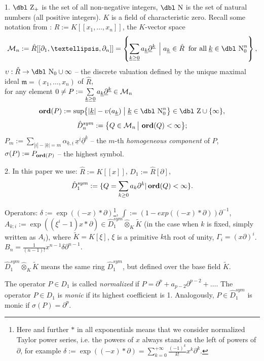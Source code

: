 \documentclass[11pt]{article}
\theoremstyle{definition}
\newcommand{\dz}{{\mbox{\dbl Z}}}
\newcommand{\dn}{{\mbox{\dbl N}}}
\newcommand{\idm}{\mathfrak{m}}
\newcommand{\Ord}{\mathop {\rm \bf ord}}
\theoremstyle{plain}
\numberwithin{equation}{section}
\newcommand{\cm}{{{\cal M}}}
\begin{document}
1. $\dz_+$ is the set of all non-negative integers, $\dn$ is the set of natural numbers (all positive integers). $K$ is a field of characteristic zero. Recall some notation from \cite{A.Z}:
	$\hat{R}:=K [[x_1,\ldots ,x_n]]$, the $K$-vector space 
$$
\cm_n := \hat{R} [[\partial_1, \dots, \partial_n]] = \left\{
\sum\limits_{\underline{k} \ge \underline{0}} a_{\underline{k}} \underline{\partial}^{\underline{k}} \; \left|\;  a_{\underline{k}} \in \hat{R} \right. \;\mbox{for all}\;  \underline{k} \in \dn_0^n
\right\},
$$
$\upsilon:\hat{R}\rightarrow \dn_0\cup \infty$ --  the discrete valuation defined by the unique maximal ideal $\idm = (x_1, \dots, x_n)$ of $\hat{R}$,  \\
for any element
$
0\neq P := \sum\limits_{\underline{k} \ge \underline{0}} a_{\underline{k}} \underline{\partial}^{\underline{k}} \in \cm_n
$
$$
\Ord (P) := \sup\bigl\{|\underline{k}| - \upsilon(a_{\underline{k}}) \; \big|\; \underline{k} \in \dn_0^n \bigr\} \in \dz \cup \{\infty \},
$$
$$
\hat{D}_n^{sym}:=\bigl\{Q \in \cm_n \,\big|\, \Ord (Q) < \infty \bigr\};
$$
$
P_m:= \sum\limits_{ |\underline{i}| - |\underline{k}| = m} \alpha_{\underline{k}, \underline{i}} \,  \underline{x}^{\underline{i}} \underline{\partial}^{\underline{k}}
$ -- the $m$-th \emph{homogeneous component} of $P$,\\
$\sigma (P):=P_{\Ord (P)}$ -- the highest symbol.
	
2. In this paper we use: 	
	$\hat{R}:=K[[x]]$, $D_1:=\hat{R}[\partial]$, 
$$\hat{D}_1^{sym}:=\{Q=\sum_{k\ge 0}a_k\partial^k|\Ord(Q)<\infty\}.$$ 

Operators:  $\delta:=\exp((-x)\ast \partial)$\footnote{ Here and further $\ast$ in all exponentials means that we consider normalized Taylor power series, i.e. the powers of $x$ always stand on the left of powers of $\partial$, for example $\delta:=\exp((-x)\ast \partial)=\sum_{k=0}^{+\infty}\frac{(-1)^k}{k!}x^k\partial^k$.},   $\int:=(1-exp((-x)\ast \partial))\partial^{-1} $,  	$A_{k;i}:=\exp((\xi^{i}-1)x\ast \partial)\in \hat{D}^{sym}_{1}\hat{\otimes}_{K}\tilde{K}$ (in the case when $k$ is fixed, simply written as $A_i$), where $\tilde{K}=K[\xi]$, $\xi$ is a primitive $k$th root of unity, 
$\Gamma_i=(x\partial)^i$. $B_n=\frac{1}{(n-1)!}x^{n-1}\delta\partial^{n-1}$. 

$\hat{D}^{sym}_{1}\hat{\otimes}_{K}\tilde{K}$ means the same ring $\hat{D}^{sym}_{1}$, but defined over the base field $\tilde{K}$.

The operator $P\in D_1$ is called {\it normalized} if $P=\partial^p+a_{p-2}\partial^{p-2}+\ldots $. The operator $P\in D_1$ is {\it monic} if its highest coefficient is 1. Analogously, $P\in \hat{D}_1^{sym}$ is monic if $\sigma (P)=\partial^p$. 
\end{document}
